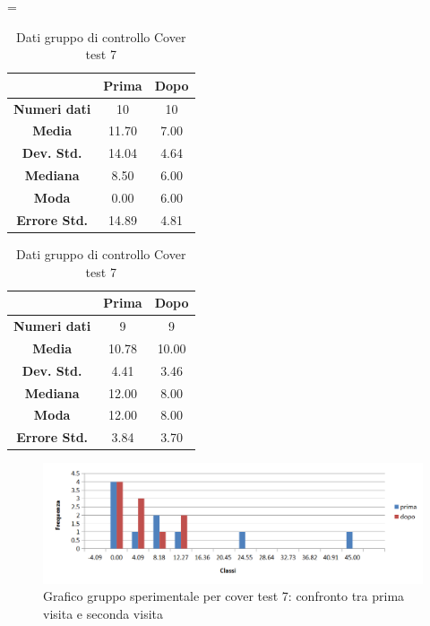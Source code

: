 \begin{table}
\centering
\setlength\tabcolsep{4pt}
\begin{minipage}{0.48\textwidth}
\centering
\tablewidth=\textwidth

\begin{tabular}{|c|c|c|} \hline
{\textbf{}} & {\textbf{  \hspace{8pt}Prima\hspace{8pt} }} & {\textbf{ \hspace{8pt}Dopo\hspace{8pt}  }}\\ \hline
\textbf{Numeri dati} & 10 & 10 \\ 
\textbf{Media} & 11.70 & 7.00 \\  
\textbf{Dev. Std.} & 14.04 & 4.64 \\  
\textbf{Mediana} & 8.50 & 6.00 \\ 
\textbf{Moda} & 0.00 & 6.00 \\ 
\textbf{Errore Std.} & 14.89 & 4.81 \\ 
\hline
\end{tabular}
\caption{Dati gruppo sperimentale Cover test 7}

\label{tab:accuracy} 
\end{minipage}%
\hfill
\begin{minipage}{0.48\textwidth}
\centering

\begin{tabular}{|c|c|c|} \hline
{\textbf{}} & {\textbf{  \hspace{8pt}Prima\hspace{8pt} }} & {\textbf{ \hspace{8pt}Dopo\hspace{8pt}  }}\\ \hline
\textbf{Numeri dati} & 9 & 9 \\ 
\textbf{Media} & 10.78 & 10.00 \\  
\textbf{Dev. Std.} & 4.41 & 3.46 \\  
\textbf{Mediana} & 12.00 & 8.00 \\  
\textbf{Moda} & 12.00 & 8.00 \\
\textbf{Errore Std.} & 3.84 & 3.70 \\
\hline
\end{tabular}
\caption{Dati gruppo di controllo Cover test 7}

 \label{tab:ompdiff} 
\end{minipage}
\end{table}
 \begin{figure}[h!]
	\centering
	\includegraphics[scale=0.8]{source/grafici/COVER_TEST_7_TRATTATI_NUOVO.png}
	\caption[figure]{Grafico gruppo sperimentale per cover test 7: confronto tra prima visita e seconda visita}
	\label{fig:issuexample}
\end{figure}
